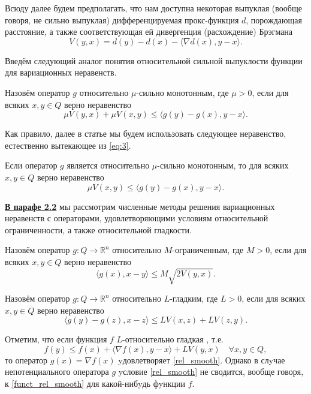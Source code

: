 Всюду далее будем предполагать, что нам доступна некоторая выпуклая (вообще говоря, не сильно выпуклая) дифференцируемая прокс-функция $d$, порождающая расстояние, а также соответствующая ей дивергенция (расхождение) Брэгмана \cite{Bauschke}
\begin{equation}\label{Brg_form}
V(y, x) = d(y) - d(x) - \langle \nabla d(x), y - x \rangle.
\end{equation}

Введём следующий аналог понятия относительной сильной выпуклости функции \cite{Lu_Nesterov_2018} для вариационных неравенств.
\begin{definition}\label{DefRelStrongMonot}
Назовём оператор $g$ относительно $\mu$-сильно монотонным, где $\mu >0$, если для всяких $x, y \in Q$ верно неравенство
    \begin{equation}\label{eq:3}
         \mu V(y, x) + \mu V(x, y) \leq \langle g(y) - g(x), y - x \rangle.
     \end{equation}
\end{definition}
Как правило, далее в статье мы будем использовать следующее неравенство, естественно вытекающее из \eqref{eq:3}.
\begin{remark}
Если оператор $g$ является  относительно $\mu$-сильно монотонным, то для всяких $x, y \in Q$ верно неравенство
$$
         \mu V(x, y) \leq \langle g(y) - g(x), y - x \rangle.
$$
\end{remark}

\underline{\textbf{В парафе 2.2}} мы рассмотрим численные методы решения вариационных неравенств с операторами, удовлетворяющими условиям относительной ограниченности, а также относительной гладкости.
\begin{definition}\label{DefRelBound}\cite{Main}
    Назовём оператор $g: Q \longrightarrow \mathbb{R}^n$ относительно $M$-огранич\-енным, где $M >0$, если для всяких $x, y \in Q$ верно неравенство
    \begin{equation}\label{rel_bound}
         \langle g(x), x - y \rangle \leq M\sqrt{2V(y,x)}.
     \end{equation}
\end{definition}
\begin{definition}\cite{Inex}
    Назовём оператор $g: Q \longrightarrow \mathbb{R}^n$ относительно $L$-гладким, где $L > 0$, если для всяких $x, y \in Q$ верно неравенство
    \begin{equation}\label{rel_smooth}
        \langle g(y)-g(z),x-z\rangle \leq LV(x,z) + LV(z,y).
    \end{equation}
\end{definition}
Отметим, что если функция $f$ $L$-относительно гладкая \cite{Bauschke}, т.е.
\begin{equation}\label{funct_rel_smooth}
    f(y) \leq f(x) + \langle \nabla f(x), y - x\rangle + LV(y, x) \quad \forall x, y \in Q,
\end{equation}
то оператор $g(x) = \nabla f(x)$ yдовлетворяет \eqref{rel_smooth}. Однако в слyчае непотенциального оператора $g$ yсловие \eqref{rel_smooth} не сводится, вообще говоря, к \eqref{funct_rel_smooth} для какой-нибyдь фyнкции $f$.


